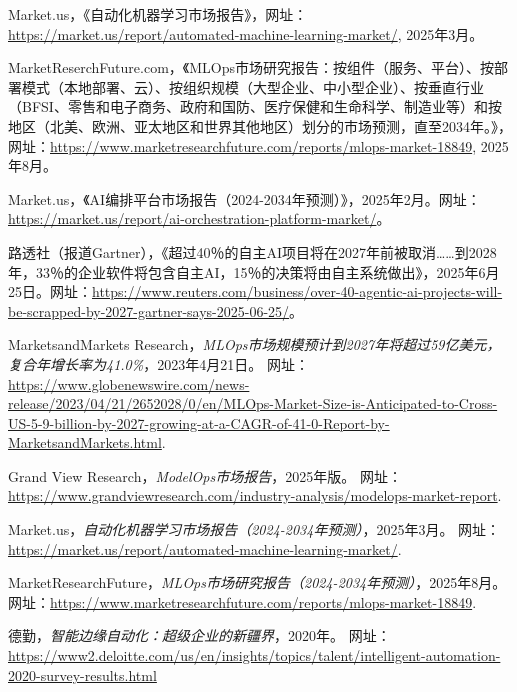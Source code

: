 \documentclass[11pt, a4paper, oneside]{article}
\begin{document}
\newpage
\begin{thebibliography}{99}
    Market.us，《自动化机器学习市场报告》，网址：\url{https://market.us/report/automated-machine-learning-market/}, 2025年3月。
    
    MarketReserchFuture.com，《MLOps市场研究报告：按组件（服务、平台）、按部署模式（本地部署、云）、按组织规模（大型企业、中小型企业）、按垂直行业（BFSI、零售和电子商务、政府和国防、医疗保健和生命科学、制造业等）和按地区（北美、欧洲、亚太地区和世界其他地区）划分的市场预测，直至2034年。》，网址：\url{https://www.marketresearchfuture.com/reports/mlops-market-18849}, 2025年8月。
    
    Market.us，《AI编排平台市场报告（2024-2034年预测）》，2025年2月。网址：\url{https://market.us/report/ai-orchestration-platform-market/}。

    路透社（报道Gartner），《超过40％的自主AI项目将在2027年前被取消……到2028年，33％的企业软件将包含自主AI，15％的决策将由自主系统做出》，2025年6月25日。网址：\url{https://www.reuters.com/business/over-40-agentic-ai-projects-will-be-scrapped-by-2027-gartner-says-2025-06-25/}。


    MarketsandMarkets Research，\textit{MLOps市场规模预计到2027年将超过59亿美元，复合年增长率为41.0\%}，2023年4月21日。
    网址：\url{https://www.globenewswire.com/news-release/2023/04/21/2652028/0/en/MLOps-Market-Size-is-Anticipated-to-Cross-US-5-9-billion-by-2027-growing-at-a-CAGR-of-41-0-Report-by-MarketsandMarkets.html}.

    Grand View Research，\textit{ModelOps市场报告}，2025年版。
    网址：\url{https://www.grandviewresearch.com/industry-analysis/modelops-market-report}.

    Market.us，\textit{自动化机器学习市场报告（2024-2034年预测）}，2025年3月。
    网址：\url{https://market.us/report/automated-machine-learning-market/}.

    MarketResearchFuture，\textit{MLOps市场研究报告（2024-2034年预测）}，2025年8月。
    网址：\url{https://www.marketresearchfuture.com/reports/mlops-market-18849}.

    德勤，\textit{智能边缘自动化：超级企业的新疆界}，2020年。
    网址：\url{https://www2.deloitte.com/us/en/insights/topics/talent/intelligent-automation-2020-survey-results.html}


\end{thebibliography}
\end{document}
